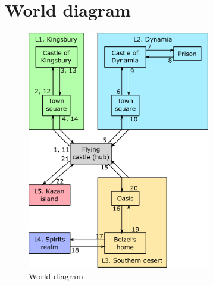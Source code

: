\section{World diagram}
\begin{figure}[H]
  \centering
  \includegraphics[width=8cm]{Images/SVG/Exported/worldDiagram}
  \caption{World diagram}
\end{figure}

